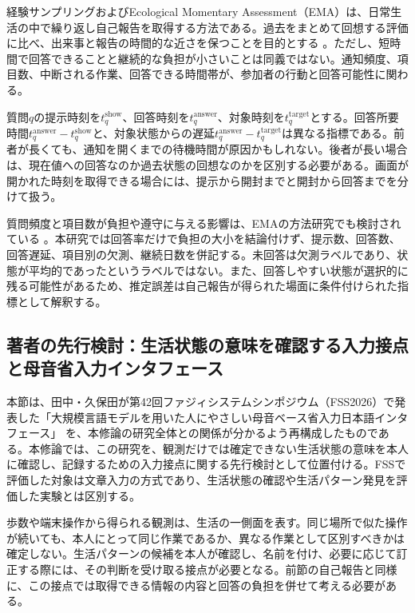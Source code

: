 経験サンプリングおよびEcological Momentary Assessment（EMA）は、日常生活の中で繰り返し自己報告を取得する方法である。過去をまとめて回想する評価に比べ、出来事と報告の時間的な近さを保つことを目的とする \autocite{stone1994momentary,shiffman2008ema}。ただし、短時間で回答できることと継続的な負担が小さいことは同義ではない。通知頻度、項目数、中断される作業、回答できる時間帯が、参加者の行動と回答可能性に関わる。

質問\(q\)の提示時刻を\(t_q^{\mathrm{show}}\)、回答時刻を\(t_q^{\mathrm{answer}}\)、対象時刻を\(t_q^{\mathrm{target}}\)とする。回答所要時間\(t_q^{\mathrm{answer}}-t_q^{\mathrm{show}}\)と、対象状態からの遅延\(t_q^{\mathrm{answer}}-t_q^{\mathrm{target}}\)は異なる指標である。前者が長くても、通知を開くまでの待機時間が原因かもしれない。後者が長い場合は、現在値への回答なのか過去状態の回想なのかを区別する必要がある。画面が開かれた時刻を取得できる場合には、提示から開封までと開封から回答までを分けて扱う。

質問頻度と項目数が負担や遵守に与える影響は、EMAの方法研究でも検討されている \autocite{eisele2022burden}。本研究では回答率だけで負担の大小を結論付けず、提示数、回答数、回答遅延、項目別の欠測、継続日数を併記する。未回答は欠測ラベルであり、状態が平均的であったというラベルではない。また、回答しやすい状態が選択的に残る可能性があるため、推定誤差は自己報告が得られた場面に条件付けられた指標として解釈する。

\subsection{著者の先行検討：生活状態の意味を確認する入力接点と母音省入力インタフェース}

本節は、田中・久保田が第42回ファジィシステムシンポジウム（FSS2026）で発表した「大規模言語モデルを用いた人にやさしい母音ベース省入力日本語インタフェース」 \autocite{tanaka2026fss}を、本修論の研究全体との関係が分かるよう再構成したものである。本修論では、この研究を、観測だけでは確定できない生活状態の意味を本人に確認し、記録するための入力接点に関する先行検討として位置付ける。FSSで評価した対象は文章入力の方式であり、生活状態の確認や生活パターン発見を評価した実験とは区別する。

歩数や端末操作から得られる観測は、生活の一側面を表す。同じ場所で似た操作が続いても、本人にとって同じ作業であるか、異なる作業として区別すべきかは確定しない。生活パターンの候補を本人が確認し、名前を付け、必要に応じて訂正する際には、その判断を受け取る接点が必要となる。前節の自己報告と同様に、この接点では取得できる情報の内容と回答の負担を併せて考える必要がある。

